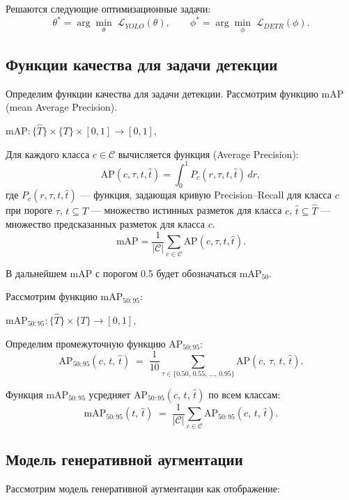 Решаются следующие оптимизационные задачи:
\[
\theta^* = \arg\min_{\theta}\;\mathcal{L}_{YOLO}(\theta),
\qquad
\phi^* = \arg\min_{\phi}\;\mathcal{L}_{DETR}(\phi).
\]


\subsection{Функции качества для задачи детекции}
Определим функции качества для задачи детекции.
Рассмотрим функцию $\text{mAP}$ (mean Average Precision).
\begin{center}
   $\text{mAP}: \{ \hat{T} \}  \times \{ T \} \times [0,1] \to [0,1]$,
\end{center}



Для каждого класса \(c \in \mathcal{C}\) вычисляется функция  (Average Precision):
\[
\text{AP}(c, \tau, t, \hat{t}) = \int_{0}^{1} P_c(r, \tau, t, \hat{t}) \, dr,
\]
где \(P_c(r, \tau, t, \hat{t})\) --- функция, задающая кривую Precision–Recall для класса \(c\) при пороге $\tau$, $t \subseteq T$ — множество истинных разметок для класса \(c\), $\hat{t} \subseteq \hat{T}$ — множество предсказанных разметок для класса \(c\).
\[
\text{mAP} = \frac{1}{|\mathcal{C}|} \sum_{c \in \mathcal{C}} \text{AP}(c, \tau, t, \hat{t}).
\]

В дальнейшем mAP с порогом 0.5 будет обозначаться $\text{mAP}_{50}$.

Рассмотрим функцию $\text{mAP}_{50:95}$:
\begin{center}
   $\text{mAP}_{50:95}:  \{ \hat{T} \}  \times \{ T \} \to [0,1]$,
\end{center}

Определим промежуточную функцию $\text{AP}_{50:95}$:
\[
\text{AP}_{50:95}(c,\,t,\,\hat{t})
\;=\;
\frac{1}{10} 
\sum_{\tau \in \{0.50,\,0.55,\,\dots,\,0.95\}}
\text{AP}(c,\,\tau,\,t,\,\hat{t}).
\]

Функция $\text{mAP}_{50:95}$ усредняет $\text{AP}_{50:95}(c,\,t,\,\hat{t})$ по всем классам:
\[
\text{mAP}_{50:95}(t,\,\hat{t})
\;=\;
\frac{1}{|\mathcal{C}|}
\sum_{c \in \mathcal{C}}
\text{AP}_{50:95}(c,\,t,\,\hat{t}).
\]
\subsection{Модель генеративной аугментации}

Рассмотрим модель генеративной аугментации как отображение:

